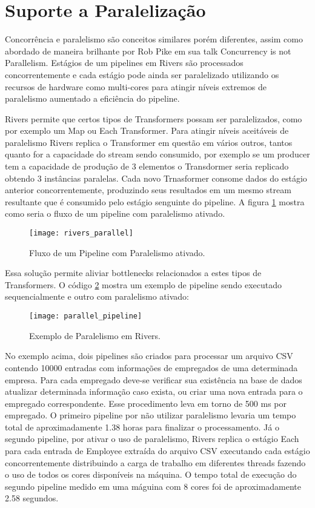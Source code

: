 \section{Suporte a Paralelização}
\label{sec:rivers:going_parallel}

Concorrência e paralelismo são conceitos similares porém diferentes, assim como abordado de maneira brilhante por Rob Pike em sua talk \cite{talk:rob_pike:concurrency_not_parallelism} Concurrency is not Parallelism. Estágios de um pipelines em Rivers são processados concorrentemente e cada estágio pode ainda ser paralelizado utilizando os recursos de hardware como multi-cores para atingir níveis extremos de paralelismo aumentado a eficiência do pipeline.

Rivers permite que certos tipos de Transformers possam ser paralelizados, como por exemplo um Map ou Each Transformer. Para atingir níveis aceitáveis de paralelismo Rivers replica o Transformer em questão em vários outros, tantos quanto for a capacidade do stream sendo consumido, por exemplo se um producer tem a capacidade de produção de 3 elementos o Transdormer seria replicado obtendo 3 instâncias paralelas. Cada novo Trnasformer consome dados do estágio anterior concorrentemente, produzindo seus resultados em um mesmo stream resultante que é consumido pelo estágio senguinte do pipeline. A figura \ref{fig:rivers:rivers_parallel} mostra como seria o fluxo de um pipeline com paralelismo ativado.

\begin{figure}[H]
  \texttt{[image: rivers\_parallel]}
  \centering
  \caption{Fluxo de um Pipeline com Paralelismo ativado.}
  \label{fig:rivers:rivers_parallel}
\end{figure}

Essa solução permite aliviar bottlenecks relacionados a estes tipos de Transformers. O código \ref{code:rivers:parallel_pipeline} mostra um exemplo de pipeline sendo executado sequencialmente e outro com paralelismo ativado:

\begin{figure}[H]
  \texttt{[image: parallel\_pipeline]}
  \centering
  \caption{Exemplo de Paralelismo em Rivers.}
  \label{code:rivers:parallel_pipeline}
\end{figure}

No exemplo acima, dois pipelines são criados para processar um arquivo CSV contendo 10000 entradas com informações de empregados de uma determinada empresa. Para cada empregado deve-se verificar sua existência na base de dados atualizar determinada informação caso exista, ou criar uma nova entrada para o empregado correspondente. Esse procedimento leva em torno de 500 ms por empregado. O primeiro pipeline por não utilizar paralelismo levaria um tempo total de aproximadamente 1.38 horas para finalizar o processamento. Já o segundo pipeline, por ativar o uso de paralelismo, Rivers replica o estágio Each para cada entrada de Employee extraída do arquivo CSV executando cada estágio concorrentemente distribuindo a carga de trabalho em diferentes threads fazendo o uso de todos os cores disponíveis na máquina. O tempo total de execução do segundo pipeline medido em uma máguina com 8 cores foi de aproximadamente 2.58 segundos.